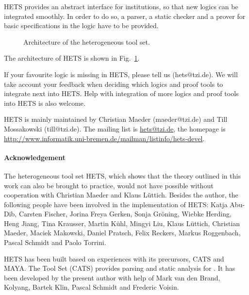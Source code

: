 \documentclass{article}
\newcommand{\normalTEXTSC}[2]{{#1\scriptsize#2}}
\newcommand     {\MAYA}{\normalTEXTSC{M}{AYA}\xspace}
\newcommand     {\Hets}{\normalTEXTSC{H}{ETS}\xspace}
\newcommand     {\Cats}{\normalTEXTSC{C}{ATS}\xspace}
\begin{document}
\Hets provides an abstract interface for 
institutions, so
that new logics can be integrated smoothly. 
In order to do so, a parser,
a static checker and a prover for basic specifications in the logic have
to be provided.



\begin{figure}
\vspace{1em}

\caption{Architecture of the heterogeneous tool set.
\label{fig:hets}}
\end{figure}

The architecture of \Hets is shown in Fig.~\ref{fig:hets}. 

If your favourite logic is missing in \Hets, please tell us
(hets@tzi.de). We will take account your feedback when deciding which
logics and proof tools to integrate next into \Hets. Help with
integration of more logics and proof tools into \Hets is also welcome.

\Hets is mainly maintained by
Christian Maeder (maeder@tzi.de) and Till Mossakowski
(till@tzi.de). The mailing list is \url{hets@tzi.de},
the homepage is
\url{http://www.informatik.uni-bremen.de/mailman/listinfo/hets-devel}.

\paragraph{Acknowledgement}
The heterogeneous tool set \Hets, which shows that the theory outlined
in this work can also be brought to practice, would not have possible
without cooperation with Christian Maeder and Klaus L\"uttich.
Besides the author, the following people have been involved
in the implementation of \Hets:
Katja Abu-Dib,
Carsten Fischer,
Jorina Freya Gerken,
Sonja Gr\"{o}ning,
Wiebke Herding,
Heng Jiang,
Tina Krausser,
Martin K\"{u}hl,
Mingyi Liu,
Klaus L\"{u}ttich,
Christian Maeder,
Maciek Makowski,
Daniel Pratsch,
Felix Reckers,
Markus Roggenbach, 
Pascal Schmidt and
Paolo Torrini.

\Hets has been built based on experiences with its
precursors, 
                \index{Cats@\Cats}%
\Cats and 
                \index{Maya@\MAYA}%
\MAYA.
The \CASL Tool Set (\Cats) 
\cite{Mossakowski:2000:CST,Mossakowski:1998:SSA}
provides parsing and static analysis for \CASL.
It has been developed by the present author with help
of Mark van den Brand, Kolyang, Bartek Klin, Pascal Schmidt and 
Frederic Voisin.
\end{document}

